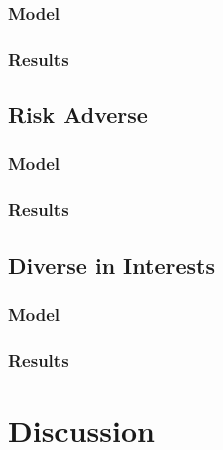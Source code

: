 \documentclass[acmlarge]{acmart}
\begin{document}
\subsubsection{Model}
\subsubsection{Results}

\subsection{Risk Adverse}
\subsubsection{Model}
\subsubsection{Results}

\subsection{Diverse in Interests}
\subsubsection{Model}
\subsubsection{Results}


\section{Discussion}
\end{document}
